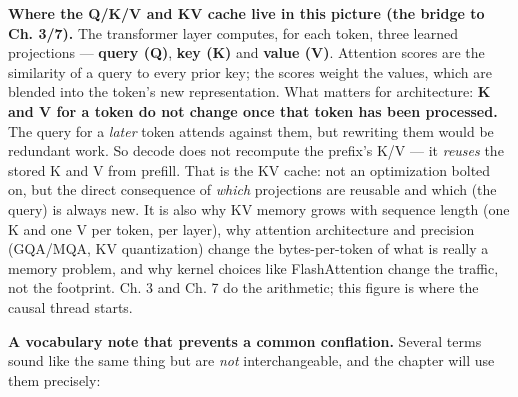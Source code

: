 \textbf{Where the Q/K/V and KV cache live in this picture (the bridge to
Ch. 3/7).} The transformer layer computes, for each token, three learned
projections --- \textbf{query (Q)}, \textbf{key (K)} and \textbf{value
(V)}. Attention scores are the similarity of a query to every prior key;
the scores weight the values, which are blended into the token's new
representation. What matters for architecture: \textbf{K and V for a
token do not change once that token has been processed.} The query for a
\emph{later} token attends against them, but rewriting them would be
redundant work. So decode does not recompute the prefix's K/V --- it
\emph{reuses} the stored K and V from prefill. That is the KV cache: not
an optimization bolted on, but the direct consequence of \emph{which}
projections are reusable and which (the query) is always new. It is also
why KV memory grows with sequence length (one K and one V per token, per
layer), why attention architecture and precision (GQA/MQA, KV
quantization) change the bytes-per-token of what is really a memory
problem, and why kernel choices like FlashAttention change the traffic,
not the footprint. Ch. 3 and Ch. 7 do the arithmetic; this figure is
where the causal thread starts.

\textbf{A vocabulary note that prevents a common conflation.} Several
terms sound like the same thing but are \emph{not} interchangeable, and
the chapter will use them precisely:

